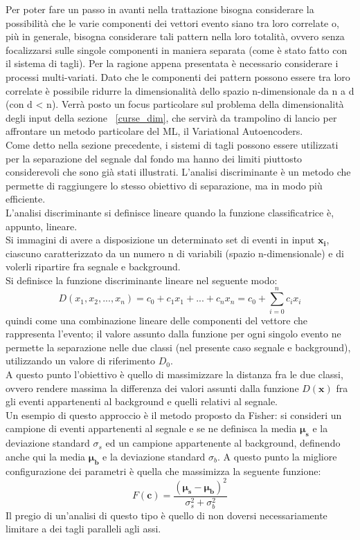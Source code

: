 Per poter fare un passo in avanti nella trattazione bisogna considerare la possibilità che le varie componenti dei vettori evento siano tra loro correlate o, più in generale, bisogna considerare tali pattern nella loro totalità, ovvero senza focalizzarsi sulle singole componenti in maniera separata (come è stato fatto con il sistema di tagli).  Per la ragione appena presentata è necessario considerare i processi multi-variati.	Dato che le componenti dei pattern possono essere tra loro correlate è possibile ridurre la dimensionalità dello spazio n-dimensionale da n a d (con d < n). Verrà posto un focus particolare sul problema della dimensionalità degli input della sezione ~\ref{curse_dim}, che servirà da trampolino di lancio per affrontare un metodo particolare del ML, il Variational Autoencoders. \\
Come detto nella sezione precedente, i sistemi di tagli possono essere utilizzati per la separazione del segnale dal fondo ma hanno dei limiti piuttosto considerevoli che sono già stati illustrati. L'analisi discriminante è un metodo che permette di raggiungere lo stesso obiettivo di separazione, ma in modo più efficiente. \\
L'analisi discriminante si definisce lineare quando la funzione classificatrice è, appunto, lineare. \\
Si immagini di avere a disposizione un determinato set di eventi in input $\textbf{x}_\textbf{i}$, ciascuno caratterizzato da un numero n di variabili (spazio n-dimensionale) e di volerli ripartire fra segnale e background.\\
Si definisce la funzione discriminante lineare nel seguente modo:
\begin{equation}
D(x_1 , x_2 , ... , x_n) = c_0 + c_1x_1 + ... +c_nx_n = c_0 + \sum_{i=0}^{n} c_ix_i 
\end{equation}
quindi come una combinazione lineare delle componenti del vettore che rappresenta l'evento; il valore assunto dalla funzione per ogni singolo evento ne permette la separazione nelle due classi (nel presente caso segnale e background), utilizzando un valore di riferimento $D_0$. \\
A questo punto l'obiettivo è quello di massimizzare la distanza fra le due classi, ovvero rendere massima la differenza dei valori assunti dalla funzione $D(\textbf{x})$ fra gli eventi appartenenti al background e quelli relativi al segnale. \\
Un esempio di questo approccio è il metodo proposto da Fisher: si consideri un campione di eventi appartenenti al segnale e se ne definisca la media $\bm\mu_\textbf{s}$ e la deviazione standard $\sigma_s$ ed un campione appartenente al background, definendo anche qui la media $\bm\mu_\textbf{b}$ e la deviazione standard $\sigma_b$. A questo punto la migliore configurazione dei parametri è quella che massimizza la seguente funzione: 
\begin{equation}
F(\textbf{c}) = \frac{(\bm\mu_\textbf{s} - \bm\mu_\textbf{b})^2}{\sigma_s^2 + \sigma_b^2}
\end{equation} 
Il pregio di un'analisi di questo tipo è quello di non doversi necessariamente limitare a dei tagli paralleli agli assi. 

